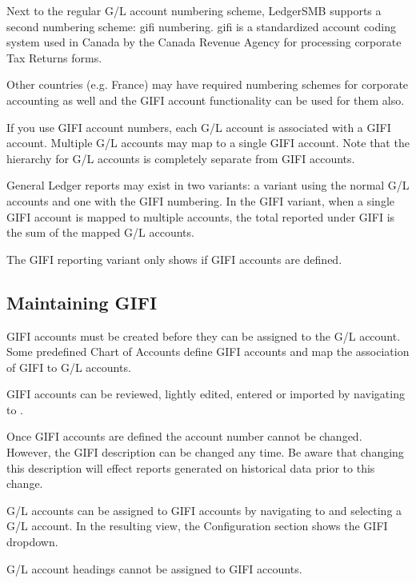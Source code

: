 Next to the regular \lsmbsp G/L account numbering scheme, LedgerSMB supports a second
numbering scheme:  \gls{gifi} numbering. \gls{gifi} is a standardized account
coding system used in Canada by the Canada Revenue Agency for processing
corporate Tax Returns forms. 

Other countries (e.g. France) may have required numbering schemes for
corporate accounting as well and the GIFI account functionality can be used for them also.

If you use GIFI account numbers, each \lsmbsp G/L account is associated with a GIFI account. 
Multiple G/L accounts may map to a single GIFI account.
Note that the hierarchy for G/L accounts is completely separate from GIFI accounts.

General Ledger reports may exist in two variants: a variant using the
normal G/L accounts and one with the GIFI numbering. 
In the GIFI variant, when a single GIFI account is mapped to multiple \lsmbsp accounts, the total reported
under GIFI is the sum of the mapped G/L accounts.

The GIFI reporting variant only shows if GIFI accounts are defined. 

\subsection{Maintaining GIFI}
\label{subsec-coa-gifi-maintenance}

GIFI accounts must be created before they can be assigned to the \lsmbsp G/L account.
Some predefined Chart of Accounts define GIFI accounts and map the association of GIFI to G/L accounts.

GIFI accounts can be reviewed, lightly edited, entered or imported by navigating to .

Once GIFI accounts are defined the account number cannot be changed.  However, the GIFI description can be changed any time.
Be aware that changing this description will effect reports generated on historical data prior to this change.

\lsmbsp G/L accounts can be assigned to GIFI accounts by navigating to  and
selecting a G/L account. In the resulting view, the Configuration section shows the GIFI dropdown.

G/L account headings cannot be assigned to GIFI accounts.


